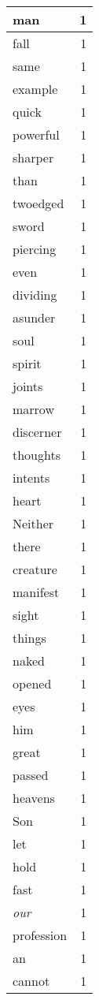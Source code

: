 \begin{center}
\begin{longtable}{l|r}
man & 1\\ \hline 
fall & 1\\ \hline 
same & 1\\ \hline 
example & 1\\ \hline 
quick & 1\\ \hline 
powerful & 1\\ \hline 
sharper & 1\\ \hline 
than & 1\\ \hline 
twoedged & 1\\ \hline 
sword & 1\\ \hline 
piercing & 1\\ \hline 
even & 1\\ \hline 
dividing & 1\\ \hline 
asunder & 1\\ \hline 
soul & 1\\ \hline 
spirit & 1\\ \hline 
joints & 1\\ \hline 
marrow & 1\\ \hline 
discerner & 1\\ \hline 
thoughts & 1\\ \hline 
intents & 1\\ \hline 
heart & 1\\ \hline 
Neither & 1\\ \hline 
there & 1\\ \hline 
creature & 1\\ \hline 
manifest & 1\\ \hline 
sight & 1\\ \hline 
things & 1\\ \hline 
naked & 1\\ \hline 
opened & 1\\ \hline 
eyes & 1\\ \hline 
him & 1\\ \hline 
great & 1\\ \hline 
passed & 1\\ \hline 
heavens & 1\\ \hline 
Son & 1\\ \hline 
let & 1\\ \hline 
hold & 1\\ \hline 
fast & 1\\ \hline 
\emph{our} & 1\\ \hline 
profession & 1\\ \hline 
an & 1\\ \hline 
cannot & 1\\ \hline 

\end{longtable}
\end{center}
